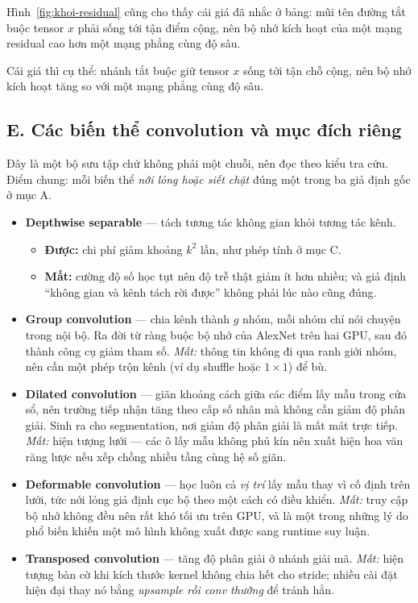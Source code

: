 \documentclass[../../../deep_learning.tex]{subfiles}
\begin{document}
Hình~\ref{fig:khoi-residual} cũng cho thấy cái giá đã nhắc ở bảng: mũi tên đường tắt buộc tensor \(x\) phải sống tới tận điểm cộng, nên bộ nhớ kích hoạt của một mạng residual cao hơn một mạng phẳng cùng độ sâu.

Cái giá thì cụ thể: nhánh tắt buộc giữ tensor \(x\) sống tới tận chỗ cộng, nên bộ nhớ kích hoạt tăng so với một mạng phẳng cùng độ sâu.

\subsection{E. Các biến thể convolution và mục đích riêng}
Đây là một bộ sưu tập chứ không phải một chuỗi, nên đọc theo kiểu tra cứu. Điểm chung: mỗi biến thể \emph{nới lỏng hoặc siết chặt} đúng một trong ba giả định gốc ở mục A.

\begin{itemize}
\item \textbf{Depthwise separable} --- tách tương tác không gian khỏi tương tác kênh.
  \begin{itemize}
  \item \textbf{Được:} chi phí giảm khoảng \(k^2\) lần, như phép tính ở mục C.
  \item \textbf{Mất:} cường độ số học tụt nên độ trễ thật giảm ít hơn nhiều; và giả định ``không gian và kênh tách rời được'' không phải lúc nào cũng đúng.
  \end{itemize}
\item \textbf{Group convolution} --- chia kênh thành \(g\) nhóm, mỗi nhóm chỉ nói chuyện trong nội bộ. Ra đời từ ràng buộc bộ nhớ của AlexNet trên hai GPU, sau đó thành công cụ giảm tham số. \emph{Mất:} thông tin không đi qua ranh giới nhóm, nên cần một phép trộn kênh (ví dụ shuffle hoặc \(1\times1\)) để bù.
\item \textbf{Dilated convolution} \cite{yu2016dilated} --- giãn khoảng cách giữa các điểm lấy mẫu trong cửa sổ, nên trường tiếp nhận tăng theo cấp số nhân mà không cần giảm độ phân giải. Sinh ra cho segmentation, nơi giảm độ phân giải là mất mát trực tiếp. \emph{Mất:} hiện tượng lưới --- các ô lấy mẫu không phủ kín nên xuất hiện hoa văn răng lược nếu xếp chồng nhiều tầng cùng hệ số giãn.
\item \textbf{Deformable convolution} \cite{dai2017deformable} --- học luôn cả \emph{vị trí} lấy mẫu thay vì cố định trên lưới, tức nới lỏng giả định cục bộ theo một cách có điều khiển. \emph{Mất:} truy cập bộ nhớ không đều nên rất khó tối ưu trên GPU, và là một trong những lý do phổ biến khiến một mô hình không xuất được sang runtime suy luận.
\item \textbf{Transposed convolution} --- tăng độ phân giải ở nhánh giải mã. \emph{Mất:} hiện tượng bàn cờ khi kích thước kernel không chia hết cho stride; nhiều cài đặt hiện đại thay nó bằng \emph{upsample rồi conv thường} để tránh hẳn.
\end{itemize}
\end{document}
